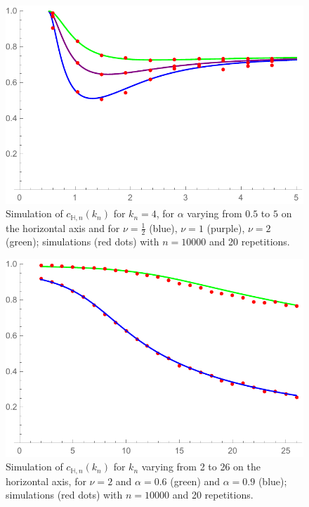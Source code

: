\begin{figure}
    \centering
    \includegraphics[scale=0.6]{figures/sim0128c4nualln10000rep20.pdf}
    \caption{Simulation of $c_{\mathbb{H},n}(k_n)$ for $k_n= 4$, for $\alpha$ varying from $0.5$ to $5$ on the horizontal axis and for $\nu=\frac{1}{2}$ (blue), $\nu=1$ (purple), $\nu=2$ (green); simulations (red dots) with $n=10 000$ and 20 repetitions.}
    \label{fig:c4allnu}
\end{figure}
\begin{figure}
    \centering
    \includegraphics[scale=0.6]{figures/sim1024ck225n10000a0609nu2rep20.pdf}
    \caption{Simulation of $c_{\mathbb{H},n}(k_n)$ for $k_n$ varying from 2 to 26 on the horizontal axis, for $\nu=2$ and $\alpha=0.6$ (green) and $\alpha=0.9$ (blue); simulations (red dots) with $n=10 000$ and 20 repetitions.}
    \label{fig:ckvariable}
\end{figure}